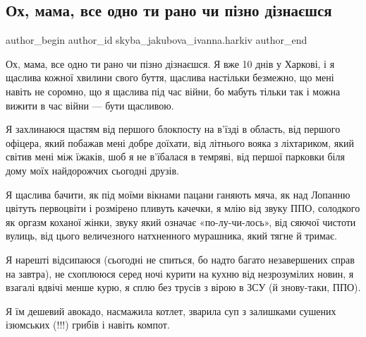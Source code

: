  
 
 
 
 
 
\subsection{Ох, мама, все одно ти рано чи пізно дізнаєшся}
\label{sec:30_03_2022.fb.skyba_jakubova_ivanna.harkiv.1.mama}
 
\ifcmt
 author_begin
   author_id skyba_jakubova_ivanna.harkiv
 author_end
\fi

Ох, мама, все одно ти рано чи пізно дізнаєшся. Я вже 10 днів у Харкові, і я
щаслива кожної хвилини свого буття, щаслива настільки безмежно, що мені навіть
не соромно, що я щаслива під час війни, бо мабуть тільки так і можна вижити в
час війни — бути щасливою. 


Я захлинаюся щастям від першого блокпосту на в'їзді в область, від першого
офіцера, який побажав мені добре доїхати, від літнього вояка з ліхтариком, який
світив мені між їжаків, шоб я не в'їбалася в темряві, від першої парковки біля
дому моїх найдорожчих сьогодні друзів. 

Я щаслива бачити, як під моїми вікнами пацани ганяють мяча, як над Лопанню
цвітуть первоцвіти і розмірено пливуть качечки, я млію від звуку ППО, солодкого
як оргазм коханої жінки, звуку який означає «по-лу-чи-лось», від сяючої чистоти
вулиць, від цього величезного натхненного мурашника, який тягне й тримає. 

Я нарешті відсипаюся (сьогодні не спиться, бо надто багато незавершених справ
на завтра), не схоплююся серед ночі курити на кухню від незрозумілих новин, я
взагалі вдвічі менше курю, я сплю без трусів з вірою в ЗСУ (й знову-таки, ППО). 


Я їм дешевий авокадо, насмажила котлет, зварила суп з залишками сушених
ізюмських (!!!) грибів і навіть компот. 

